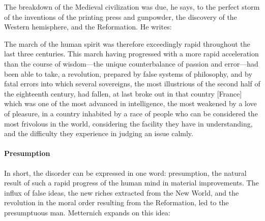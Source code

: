 The breakdown of the Medieval civilization was due, he says, to the perfect storm of the inventions of the printing press and gunpowder, the discovery of the Western hemisphere, and the Reformation. He writes:

\begin{quotex}
The march of the human spirit was therefore exceedingly rapid throughout the last three centuries. This march having progressed with a more rapid acceleration than the course of wisdom—the unique counterbalance of passion and error—had been able to take, a revolution, prepared by false systems of philosophy, and by fatal errors into which several sovereigns, the most illustrious of the second half of the eighteenth century, had fallen, at last broke out in that country [France] which was one of the most advanced in intelligence, the most weakened by a love of pleasure, in a country inhabited by a race of people who can be considered the most frivolous in the world, considering the facility they have in understanding, and the difficulty they experience in judging an issue calmly. 

\end{quotex}
\paragraph{Presumption}
In short, the disorder can be expressed in one word: presumption, the natural result of such a rapid progress of the human mind in material improvements. The influx of false ideas, the new riches extracted from the New World, and the revolution in the moral order resulting from the Reformation, led to the presumptuous man. Metternich expands on this idea:

